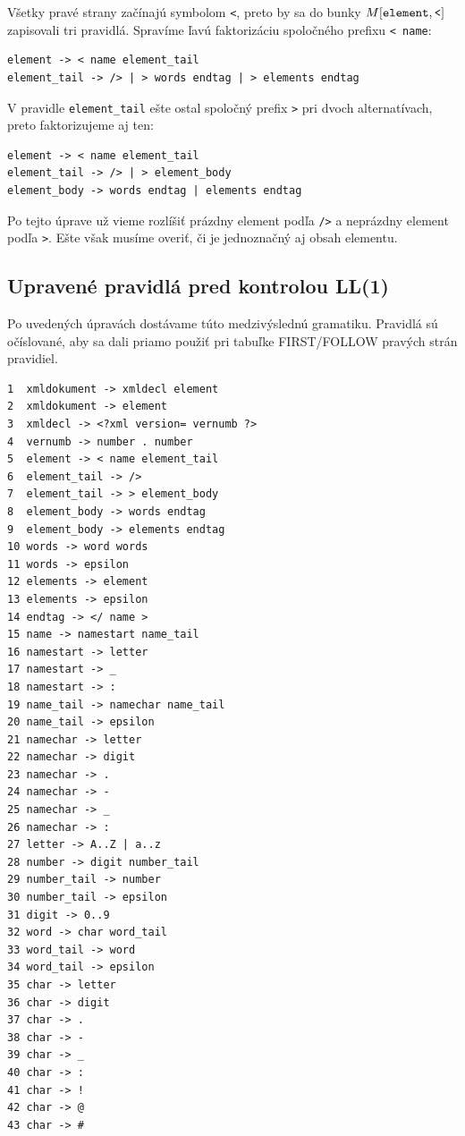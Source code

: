 \documentclass[12pt,a4paper]{article}
\newcommand{\code}[1]{\ifmmode\text{\ttfamily #1}\else\texttt{#1}\fi}
\begin{document}
Všetky pravé strany začínajú symbolom \code{<}, preto by sa do bunky \(M[\code{element}, \code{<}]\) zapisovali tri pravidlá. Spravíme ľavú faktorizáciu spoločného prefixu \code{< name}:

\begin{lstlisting}
element -> < name element_tail
element_tail -> /> | > words endtag | > elements endtag
\end{lstlisting}

V pravidle \code{element\_tail} ešte ostal spoločný prefix \code{>} pri dvoch alternatívach, preto faktorizujeme aj ten:

\begin{lstlisting}
element -> < name element_tail
element_tail -> /> | > element_body
element_body -> words endtag | elements endtag
\end{lstlisting}

Po tejto úprave už vieme rozlíšiť prázdny element podľa \code{/>} a neprázdny element podľa \code{>}. Ešte však musíme overiť, či je jednoznačný aj obsah elementu.

\subsection{Upravené pravidlá pred kontrolou LL(1)}

Po uvedených úpravách dostávame túto medzivýslednú gramatiku. Pravidlá sú očíslované, aby sa dali priamo použiť pri tabuľke FIRST/FOLLOW pravých strán pravidiel.

\begin{lstlisting}
1  xmldokument -> xmldecl element
2  xmldokument -> element
3  xmldecl -> <?xml version= vernumb ?>
4  vernumb -> number . number
5  element -> < name element_tail
6  element_tail -> />
7  element_tail -> > element_body
8  element_body -> words endtag
9  element_body -> elements endtag
10 words -> word words
11 words -> epsilon
12 elements -> element
13 elements -> epsilon
14 endtag -> </ name >
15 name -> namestart name_tail
16 namestart -> letter
17 namestart -> _
18 namestart -> :
19 name_tail -> namechar name_tail
20 name_tail -> epsilon
21 namechar -> letter
22 namechar -> digit
23 namechar -> .
24 namechar -> -
25 namechar -> _
26 namechar -> :
27 letter -> A..Z | a..z
28 number -> digit number_tail
29 number_tail -> number
30 number_tail -> epsilon
31 digit -> 0..9
32 word -> char word_tail
33 word_tail -> word
34 word_tail -> epsilon
35 char -> letter
36 char -> digit
37 char -> .
38 char -> -
39 char -> _
40 char -> :
41 char -> !
42 char -> @
43 char -> #
\end{lstlisting}
\end{document}
